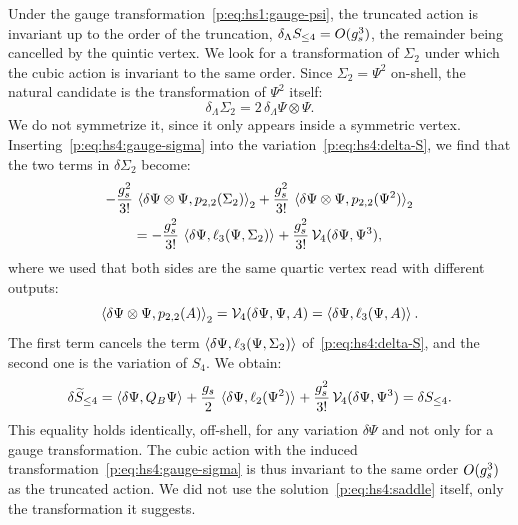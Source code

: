 Under the gauge transformation~\eqref{p:eq:hs1:gauge-psi}, the truncated action is invariant up to the order of the truncation, $\delta_\Lambda S_{\le 4} = O(\gs^3)$, the remainder being cancelled by the quintic vertex.
We look for a transformation of $\Sigma_2$ under which the cubic action is invariant to the same order.
Since $\Sigma_2 = \Psi^2$ on-shell, the natural candidate is the transformation of $\Psi^2$ itself:
\begin{equation}
  \label{p:eq:hs4:gauge-sigma}
  \delta_\Lambda \Sigma_2
    = 2 \, \delta_\Lambda \Psi \otimes \Psi.
\end{equation}
We do not symmetrize it, since it only appears inside a symmetric vertex.
Inserting~\eqref{p:eq:hs4:gauge-sigma} into the variation~\eqref{p:eq:hs4:delta-S}, we find that the two terms in $\delta \Sigma_2$ become:
\begin{equation}
  \begin{gathered}
    - \frac{\gs^2}{3!} \, \pair[2]{\delta \Psi \otimes \Psi}{\sprod{2}{2}(\Sigma_2)}
    + \frac{\gs^2}{3!} \, \pair[2]{\delta \Psi \otimes \Psi}{\sprod{2}{2}(\Psi^2)}
      \\
      = - \frac{\gs^2}{3!} \, \pair{\delta \Psi}{\ell_3(\Psi, \Sigma_2)}
        + \frac{\gs^2}{3!} \, \vertex{4}(\delta \Psi, \Psi^3),
  \end{gathered}
\end{equation}
where we used that both sides are the same quartic vertex read with different outputs:
\begin{equation}
  \label{p:eq:hs4:same-vertex}
  \pair[2]{\delta \Psi \otimes \Psi}{\sprod{2}{2}(A)}
    = \vertex{4}(\delta \Psi, \Psi, A)
    = \pair{\delta \Psi}{\ell_3(\Psi, A)}.
\end{equation}
The first term cancels the term $\pair{\delta \Psi}{\ell_3(\Psi, \Sigma_2)}$ of~\eqref{p:eq:hs4:delta-S}, and the second one is the variation of $S_4$.
We obtain:
\begin{equation}
  \label{p:eq:hs4:delta-S-equal}
  \delta \caction[\le 4]
    = \pair{\delta \Psi}{Q_B \Psi}
      + \frac{\gs}{2} \, \pair{\delta \Psi}{\ell_2(\Psi^2)}
      + \frac{\gs^2}{3!} \, \vertex{4}(\delta \Psi, \Psi^3)
    = \delta S_{\le 4}.
\end{equation}
This equality holds identically, off-shell, for any variation $\delta \Psi$ and not only for a gauge transformation.
The cubic action with the induced transformation~\eqref{p:eq:hs4:gauge-sigma} is thus invariant to the same order $O(\gs^3)$ as the truncated action.
We did not use the solution~\eqref{p:eq:hs4:saddle} itself, only the transformation it suggests.

